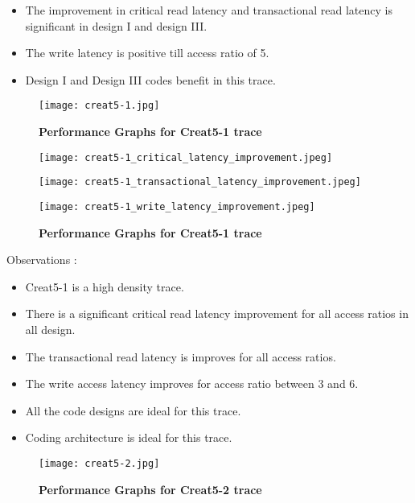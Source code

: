 \begin{landscape}
\begin{itemize}
	\item The improvement in critical read latency and transactional read latency is significant in design I and design III. 
	\item The write latency is positive till access ratio of 5.
	\item Design I and Design III codes benefit in this trace.
\end{itemize}
\cleardoublepage
\begin{figure}[htb]
\begin{minipage}[!t]{\linewidth}
        \texttt{[image: creat5-1.jpg]}
\end{minipage}
\caption{
{\bf Performance Graphs for Creat5-1 trace} }
\label{fig:creat51}
\end{figure}
\cleardoublepage
\begin{figure}[htb]
	\centering
\begin{minipage}[!t]{0.32\linewidth}
        \texttt{[image: creat5-1\_critical\_latency\_improvement.jpeg]}
\end{minipage}
\begin{minipage}[!t]{0.32\linewidth}
        \texttt{[image: creat5-1\_transactional\_latency\_improvement.jpeg]}
\end{minipage}
\begin{minipage}[!t]{0.32\linewidth}
        \texttt{[image: creat5-1\_write\_latency\_improvement.jpeg]}
\end{minipage}
\caption{
{\bf Performance Graphs for Creat5-1 trace} }
\label{fig:creat51_improvement}
\end{figure}
Observations : 
\begin{itemize}
	\item Creat5-1 is a high density trace. 
	\item There is a significant critical read latency improvement for all access ratios in all design. 
	\item The transactional read latency is improves for all access ratios. 
	\item The write access latency improves for access ratio between 3 and 6.
	\item All the code designs are ideal for this trace. 
	\item Coding architecture is ideal for this trace.
\end{itemize}
\cleardoublepage
\begin{figure}[htb]
\begin{minipage}[!t]{\linewidth}
        \texttt{[image: creat5-2.jpg]}
\end{minipage}
\caption{
{\bf Performance Graphs for Creat5-2 trace} }
\label{fig:creat52}
\end{figure}


\end{landscape}
